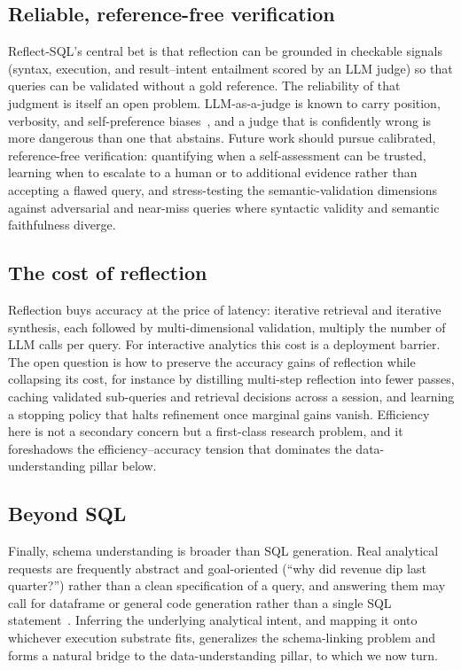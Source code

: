 \subsection{Reliable, reference-free verification}
Reflect-SQL's central bet is that reflection can be grounded in checkable signals (syntax, execution, and result--intent entailment scored by an LLM judge) so that queries can be validated without a gold reference. The reliability of that judgment is itself an open problem. LLM-as-a-judge is known to carry position, verbosity, and self-preference biases~\cite{zheng2023judging}, and a judge that is confidently wrong is more dangerous than one that abstains. Future work should pursue calibrated, reference-free verification: quantifying when a self-assessment can be trusted, learning when to escalate to a human or to additional evidence rather than accepting a flawed query, and stress-testing the semantic-validation dimensions against adversarial and near-miss queries where syntactic validity and semantic faithfulness diverge.

\subsection{The cost of reflection}
Reflection buys accuracy at the price of latency: iterative retrieval and iterative synthesis, each followed by multi-dimensional validation, multiply the number of LLM calls per query. For interactive analytics this cost is a deployment barrier. The open question is how to preserve the accuracy gains of reflection while collapsing its cost, for instance by distilling multi-step reflection into fewer passes, caching validated sub-queries and retrieval decisions across a session, and learning a stopping policy that halts refinement once marginal gains vanish. Efficiency here is not a secondary concern but a first-class research problem, and it foreshadows the efficiency--accuracy tension that dominates the data-understanding pillar below.

\subsection{Beyond SQL}
Finally, schema understanding is broader than SQL generation. Real analytical requests are frequently abstract and goal-oriented (``why did revenue dip last quarter?'') rather than a clean specification of a query, and answering them may call for dataframe or general code generation rather than a single SQL statement~\cite{he2024text2analysis,lei2024spider2}. Inferring the underlying analytical intent, and mapping it onto whichever execution substrate fits, generalizes the schema-linking problem and forms a natural bridge to the data-understanding pillar, to which we now turn.

